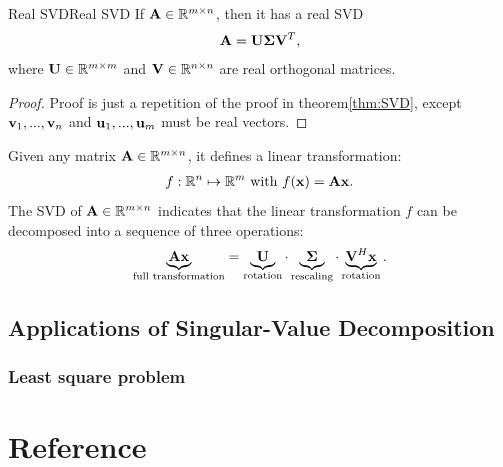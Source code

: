 \begin{theorem}{Real SVD}{Real SVD}
    If $\bold{A}\in \mathbb{R}^{m\times n}$, then it has a real SVD
    \begin{align*}
        \bold{A}=\bold{U\Sigma}\bold{V}^T,
    \end{align*}
    where $\bold{U}\in\mathbb{R}^{m\times m}$ and $\bold{V}\in \mathbb{R}^{n\times n}$ are real orthogonal matrices.
\end{theorem}
\begin{proof}
    Proof is just a repetition of the proof in theorem\ref{thm:SVD},
    except $\bold{v}_1,...,\bold{v}_n$ and $\bold{u}_1,...,\bold{u}_m$ must be real vectors.
\end{proof}

Given any matrix $\bold{A}\in \mathbb{R}^{m\times n}$, it defines a linear transformation:
\begin{align*}
    f:\mathbb{R}^n\mapsto \mathbb{R}^m \text{ with } f(\bold{x})=\bold{Ax}.
\end{align*}
The SVD of $\bold{A}\in\mathbb{R}^{m\times n}$ indicates that the linear transformation $f$ can be decomposed into a sequence of three operations:
\begin{align*}
    \underbrace{\bold{Ax}}_{\text{full transformation}} = \underbrace{\bold{U}}_{\text{rotation}}\cdot \underbrace{\bold{\Sigma}}_{\text{rescaling}}\cdot \underbrace{\bold{V}^H\bold{x}}_{\text{rotation}}.
\end{align*}


\subsection{Applications of Singular-Value Decomposition}

\subsubsection{Least square problem}


\section{Reference}

